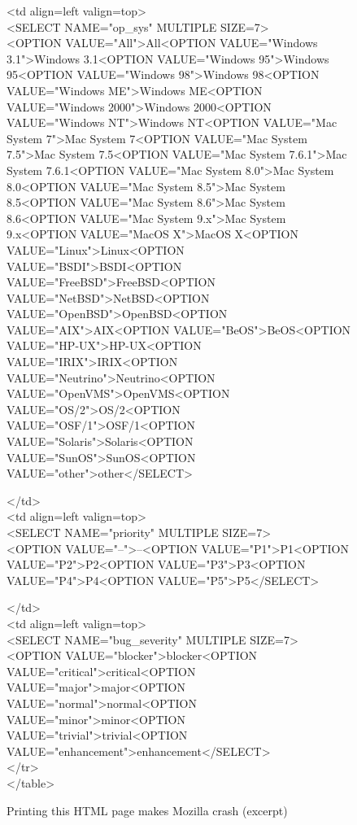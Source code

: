 \documentclass{acm_proc_article-sp}
\newcommand{\HTML}       {{\small HTML}\xspace}
\theoremstyle{plain}
\begin{document}
\begin{figure*}[t]
{\ttfamily\scriptsize
<td align=left valign=top> \\
<SELECT NAME="op\_sys" MULTIPLE SIZE=7> \\
<OPTION VALUE="All">All<OPTION VALUE="Windows 3.1">Windows 3.1<OPTION VALUE="Windows 95">Windows 95<OPTION VALUE="Windows 98">Windows 98<OPTION VALUE="Windows ME">Windows ME<OPTION VALUE="Windows 2000">Windows 2000<OPTION VALUE="Windows NT">Windows NT<OPTION VALUE="Mac System 7">Mac System 7<OPTION VALUE="Mac System 7.5">Mac System 7.5<OPTION VALUE="Mac System 7.6.1">Mac System 7.6.1<OPTION VALUE="Mac System 8.0">Mac System 8.0<OPTION VALUE="Mac System 8.5">Mac System 8.5<OPTION VALUE="Mac System 8.6">Mac System 8.6<OPTION VALUE="Mac System 9.x">Mac System 9.x<OPTION VALUE="MacOS X">MacOS X<OPTION VALUE="Linux">Linux<OPTION VALUE="BSDI">BSDI<OPTION VALUE="FreeBSD">FreeBSD<OPTION VALUE="NetBSD">NetBSD<OPTION VALUE="OpenBSD">OpenBSD<OPTION VALUE="AIX">AIX<OPTION VALUE="BeOS">BeOS<OPTION VALUE="HP-UX">HP-UX<OPTION VALUE="IRIX">IRIX<OPTION VALUE="Neutrino">Neutrino<OPTION VALUE="OpenVMS">OpenVMS<OPTION VALUE="OS/2">OS/2<OPTION VALUE="OSF/1">OSF/1<OPTION VALUE="Solaris">Solaris<OPTION VALUE="SunOS">SunOS<OPTION VALUE="other">other</SELECT>

</td> \\
<td align=left valign=top> \\
<SELECT NAME="priority" MULTIPLE SIZE=7> \\
<OPTION VALUE="--">--<OPTION VALUE="P1">P1<OPTION VALUE="P2">P2<OPTION VALUE="P3">P3<OPTION VALUE="P4">P4<OPTION VALUE="P5">P5</SELECT>

</td> \\
<td align=left valign=top> \\
<SELECT NAME="bug\_severity" MULTIPLE SIZE=7> \\
<OPTION VALUE="blocker">blocker<OPTION VALUE="critical">critical<OPTION VALUE="major">major<OPTION VALUE="normal">normal<OPTION VALUE="minor">minor<OPTION VALUE="trivial">trivial<OPTION VALUE="enhancement">enhancement</SELECT> \\
</tr> \\
</table>

}
\vspace{-\baselineskip}
\caption{Printing this \HTML page makes Mozilla crash (excerpt)}
\label{fig:bugzilla-html}
\end{figure*}
\end{document}
